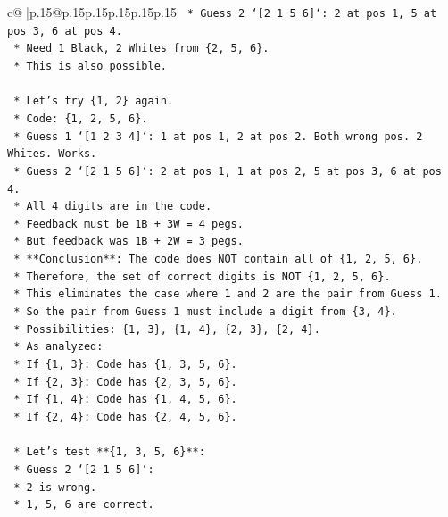 \documentclass{article}
\begin{document}
{\begin{supertabular}{c@{$\;$}|p{.15\linewidth}@{}p{.15\linewidth}p{.15\linewidth}p{.15\linewidth}p{.15\linewidth}p{.15\linewidth}}
{{{\texttt{        *   Guess 2 `{[}2 1 5 6{]}`: 2 at pos 1, 5 at pos 3, 6 at pos 4.} \\
\texttt{        *   Need 1 Black, 2 Whites from \{2, 5, 6\}.} \\
\texttt{        *   This is also possible.} \\
\\ 
\texttt{    *   Let's try \{1, 2\} again.} \\
\texttt{        *   Code: \{1, 2, 5, 6\}.} \\
\texttt{        *   Guess 1 `{[}1 2 3 4{]}`: 1 at pos 1, 2 at pos 2. Both wrong pos. 2 Whites. Works.} \\
\texttt{        *   Guess 2 `{[}2 1 5 6{]}`: 2 at pos 1, 1 at pos 2, 5 at pos 3, 6 at pos 4.} \\
\texttt{        *   All 4 digits are in the code.} \\
\texttt{        *   Feedback must be 1B + 3W = 4 pegs.} \\
\texttt{        *   But feedback was 1B + 2W = 3 pegs.} \\
\texttt{        *   **Conclusion**: The code does NOT contain all of \{1, 2, 5, 6\}.} \\
\texttt{        *   Therefore, the set of correct digits is NOT \{1, 2, 5, 6\}.} \\
\texttt{        *   This eliminates the case where 1 and 2 are the pair from Guess 1.} \\
\texttt{        *   So the pair from Guess 1 must include a digit from \{3, 4\}.} \\
\texttt{        *   Possibilities: \{1, 3\}, \{1, 4\}, \{2, 3\}, \{2, 4\}.} \\
\texttt{        *   As analyzed:} \\
\texttt{            *   If \{1, 3\}: Code has \{1, 3, 5, 6\}.} \\
\texttt{            *   If \{2, 3\}: Code has \{2, 3, 5, 6\}.} \\
\texttt{            *   If \{1, 4\}: Code has \{1, 4, 5, 6\}.} \\
\texttt{            *   If \{2, 4\}: Code has \{2, 4, 5, 6\}.} \\
\\ 
\texttt{    *   Let's test **\{1, 3, 5, 6\}**:} \\
\texttt{        *   Guess 2 `{[}2 1 5 6{]}`:} \\
\texttt{            *   2 is wrong.} \\
\texttt{            *   1, 5, 6 are correct.} \\
}}}
\end{supertabular}}
\end{document}
